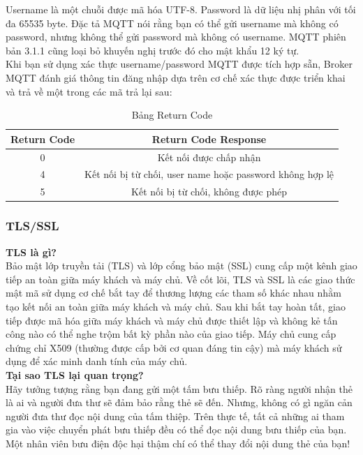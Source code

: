 \documentclass{report}
\begin{document}
Username là một chuỗi được mã hóa UTF-8. Password là dữ liệu nhị phân với tối đa 65535 byte. Đặc tả MQTT nói rằng bạn có thể gửi username mà không có password, nhưng không thể gửi password mà không có username. MQTT phiên bản 3.1.1 cũng loại bỏ khuyến nghị trước đó cho mật khẩu 12 ký tự. \\

Khi bạn sử dụng xác thực username/password MQTT được tích hợp sẵn, Broker MQTT đánh giá thông tin đăng nhập dựa trên cơ chế xác thực được triển khai và trả về một trong các mã trả lại sau: 
\begin{table}[h]
	\centering
	\label{tab:tb2}
	\begin{tabular}{|c|c|}
		\hline
		Return Code & Return Code Response                                     \\ \hline
		0           & Kết nối được chấp nhận                                   \\ \hline
		4           & Kết nối bị từ chối, user name hoặc password không hợp lệ \\ \hline
		5           & Kết nối bị từ chối, không được phép                      \\ \hline
	\end{tabular}
	\caption{Bảng Return Code}
\end{table}
\subsubsection{TLS/SSL}
\noindent
\textbf{TLS là gì?} \\

Bảo mật lớp truyền tải (TLS) và lớp cổng bảo mật (SSL) cung cấp một kênh giao tiếp an toàn giữa máy khách và máy chủ. Về cốt lõi, TLS và SSL là các giao thức mật mã sử dụng cơ chế bắt tay để thương lượng các tham số khác nhau nhằm tạo kết nối an toàn giữa máy khách và máy chủ. Sau khi bắt tay hoàn tất, giao tiếp được mã hóa giữa máy khách và máy chủ được thiết lập và không kẻ tấn công nào có thể nghe trộm bất kỳ phần nào của giao tiếp. Máy chủ cung cấp chứng chỉ X509 (thường được cấp bởi cơ quan đáng tin cậy) mà máy khách sử dụng để xác minh danh tính của máy chủ. \\

\noindent
\textbf{Tại sao TLS lại quan trọng?} \\

Hãy tưởng tượng rằng bạn đang gửi một tấm bưu thiếp. Rõ ràng người nhận thẻ là ai và người đưa thư sẽ đảm bảo rằng thẻ sẽ đến. Nhưng, không có gì ngăn cản người đưa thư đọc nội dung của tấm thiệp. Trên thực tế, tất cả những ai tham gia vào việc chuyển phát bưu thiếp đều có thể đọc nội dung bưu thiếp của bạn. Một nhân viên bưu điện độc hại thậm chí có thể thay đổi nội dung thẻ của bạn!\\
\end{document}

